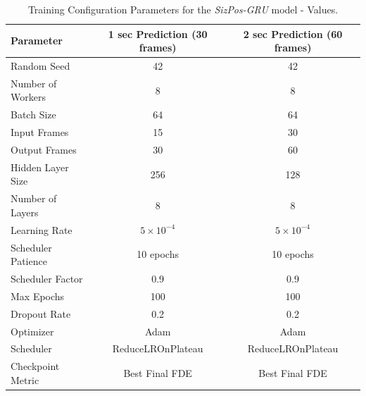 \documentclass[12pt,oneside]{book} %
\begin{document}
\begin{table}[H]
    \centering
    \caption{Training Configuration Parameters for the \textit{SizPos-GRU} model - Values.}
    \label{tab:training_parameters_values}
    \begin{adjustbox}{max width=\textwidth}
        \begin{tabular}{lcc}
            \toprule
            \textbf{Parameter} & \textbf{1 sec Prediction (30 frames)} & \textbf{2 sec Prediction (60 frames)} \\ 
            \midrule
            Random Seed        & 42                                    & 42                                    \\
            Number of Workers  & 8                                     & 8                                     \\
            Batch Size         & 64                                    & 64                                    \\
            Input Frames       & 15                                    & 30                                    \\
            Output Frames      & 30                                    & 60                                    \\
            Hidden Layer Size  & 256                                   & 128                                   \\
            Number of Layers   & 8                                     & 8                                     \\
            Learning Rate      & $5 \times 10^{-4}$                    & $5 \times 10^{-4}$                    \\
            Scheduler Patience & 10 epochs                             & 10 epochs                             \\
            Scheduler Factor   & 0.9                                   & 0.9                                   \\
            Max Epochs         & 100                                   & 100                                   \\
            Dropout Rate       & 0.2                                   & 0.2                                   \\
            Optimizer          & Adam                                  & Adam                                  \\
            Scheduler          & ReduceLROnPlateau                     & ReduceLROnPlateau                     \\
            Checkpoint Metric  & Best Final FDE                        & Best Final FDE                        \\
            \bottomrule
        \end{tabular}
    \end{adjustbox}
\end{table}
\end{document}

